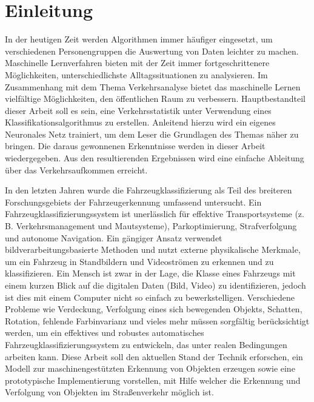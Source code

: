 
\chapter{Einleitung}

In der heutigen Zeit werden Algorithmen immer häufiger eingesetzt, um verschiedenen Personengruppen die Auswertung von Daten leichter zu machen. Maschinelle Lernverfahren bieten mit der Zeit immer fortgeschrittenere Möglichkeiten, unterschiedlichste Alltagssituationen zu analysieren. Im Zusammenhang mit dem Thema Verkehrsanalyse bietet das maschinelle Lernen vielfältige Möglichkeiten, den öffentlichen Raum zu verbessern. Hauptbestandteil dieser Arbeit soll es sein, eine Verkehrsstatistik unter Verwendung eines Klassifikationsalgorithmus zu erstellen. Anleitend hierzu wird ein eigenes Neuronales Netz trainiert, um dem Leser die Grundlagen des Themas näher zu bringen. Die daraus gewonnenen Erkenntnisse werden in dieser Arbeit wiedergegeben. Aus den resultierenden Ergebnissen wird eine einfache Ableitung über das Verkehrsaufkommen erreicht. 

In den letzten Jahren wurde die Fahrzeugklassifizierung als Teil des breiteren Forschungsgebiets der Fahrzeugerkennung umfassend untersucht. Ein Fahrzeugklassifizierungssystem ist unerlässlich für effektive Transportsysteme (z. B. Verkehrsmanagement und Mautsysteme), Parkoptimierung, Strafverfolgung und autonome Navigation. Ein gängiger Ansatz verwendet bildverarbeitungsbasierte Methoden und nutzt externe physikalische Merkmale, um ein Fahrzeug in Standbildern und Videoströmen zu erkennen und zu klassifizieren. Ein Mensch ist zwar in der Lage, die Klasse eines Fahrzeugs mit einem kurzen Blick auf die digitalen Daten (Bild, Video) zu identifizieren, jedoch ist dies mit einem Computer nicht so einfach zu bewerkstelligen. Verschiedene Probleme wie Verdeckung, Verfolgung eines sich bewegenden Objekts, Schatten, Rotation, fehlende Farbinvarianz und vieles mehr müssen sorgfältig berücksichtigt werden, um ein effektives und robustes automatisches Fahrzeugklassifizierungssystem zu entwickeln, das unter realen Bedingungen arbeiten kann. Diese Arbeit soll den aktuellen Stand der Technik erforschen, ein Modell zur maschinengestützten Erkennung von Objekten erzeugen sowie eine prototypische Implementierung vorstellen, mit Hilfe welcher die Erkennung und Verfolgung von Objekten im Straßenverkehr möglich ist. 
